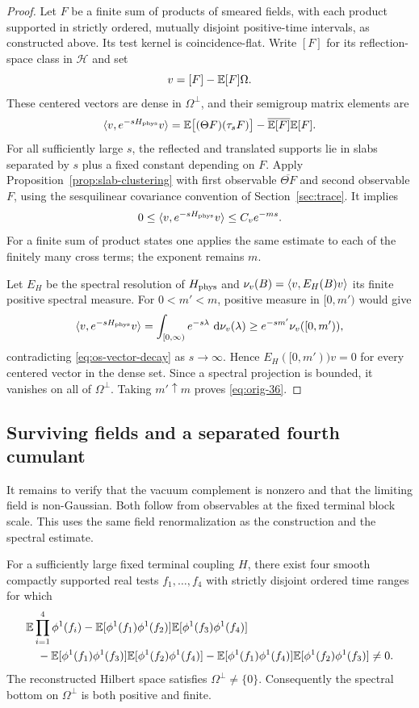 \begin{proof}
Let $F$ be a finite sum of products of smeared fields, with each product
supported in strictly ordered, mutually disjoint positive-time
intervals, as constructed above.  Its test kernel is coincidence-flat.
Write $[F]$ for its reflection-space class in $\mathcal H$ and set
\[
 v=[F]-\mathbb E[F]\Omega.
\]
These centered vectors are dense in $\Omega^\perp$, and their semigroup
matrix elements are
\[
 \langle v,e^{-sH_{\rm phys}}v\rangle
   =\mathbb E\bigl[(\Theta F)(\tau_sF)\bigr]
       -\overline{\mathbb E[F]}\mathbb E[F].
\]
For all sufficiently large $s$, the reflected and translated supports
lie in slabs separated by $s$ plus a fixed constant depending on $F$.
Apply Proposition~\ref{prop:slab-clustering} with first observable
$\overline{\Theta F}$ and second observable $F$, using the
sesquilinear covariance convention of Section~\ref{sec:trace}.  It implies
\begin{equation}
 0\le\langle v,e^{-sH_{\rm phys}}v\rangle\le C_v e^{-ms}.
 \label{eq:os-vector-decay}
\end{equation}
For a finite sum of product states one applies the same estimate to
each of the finitely many cross terms; the exponent remains $m$.

Let $E_H$ be the spectral resolution of $H_{\rm phys}$ and
$\nu_v(B)=\langle v,E_H(B)v\rangle$ its finite positive spectral measure.
For $0<m'<m$, positive measure in $[0,m')$ would give
\[
 \langle v,e^{-sH_{\rm phys}}v\rangle
    =\int_{[0,\infty)}e^{-s\lambda}\,\,\mathrm d\nu_v(\lambda)
    \ge e^{-sm'}\nu_v([0,m')),
\]
contradicting \eqref{eq:os-vector-decay} as $s\to\infty$.
Hence $E_H([0,m'))v=0$ for every centered vector in the dense set.
Since a spectral projection is bounded, it vanishes on all of
$\Omega^\perp$.  Taking $m'\uparrow m$ proves
\eqref{eq:orig-36}.
\end{proof}

\subsection{Surviving fields and a separated fourth cumulant}

It remains to verify that the vacuum complement is nonzero and that
the limiting field is non-Gaussian.  Both follow from observables at
the fixed terminal block scale.  This uses the same field
renormalization as the construction and the spectral estimate.

\begin{proposition}
\label{prop:non-gaussian}
For a sufficiently large fixed terminal coupling $H$, there exist four
smooth compactly supported real tests $f_1,\ldots,f_4$ with strictly
disjoint ordered time ranges for which
\begin{align}
 &\mathbb E\prod_{i=1}^4\phi^1(f_i)
 -\mathbb E[\phi^1(f_1)\phi^1(f_2)]\mathbb E[\phi^1(f_3)\phi^1(f_4)] \notag\\
 &\quad
 -\mathbb E[\phi^1(f_1)\phi^1(f_3)]\mathbb E[\phi^1(f_2)\phi^1(f_4)]
 -\mathbb E[\phi^1(f_1)\phi^1(f_4)]\mathbb E[\phi^1(f_2)\phi^1(f_3)]
 \ne0.
 \label{eq:nonzero-fourth-cumulant}
\end{align}
The reconstructed Hilbert space satisfies $\Omega^\perp\ne\{0\}$.
Consequently the spectral bottom on $\Omega^\perp$ is both positive
and finite.
\end{proposition}

